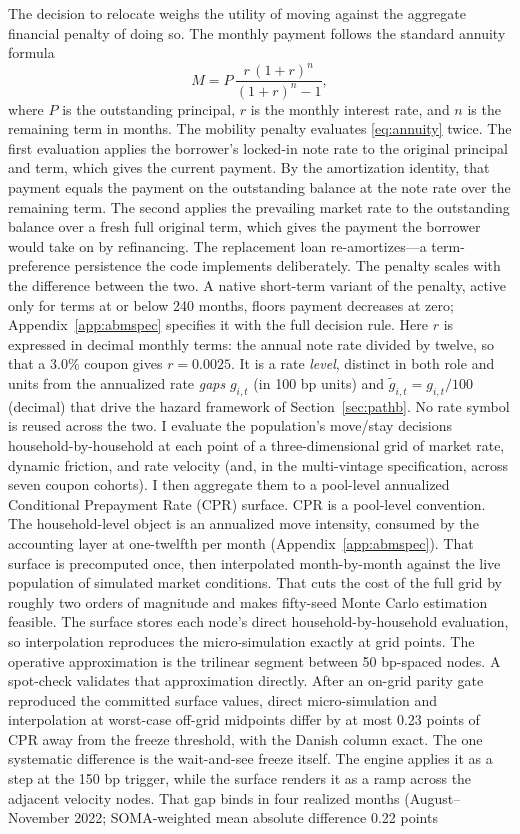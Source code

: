 \documentclass[12pt]{article}
\begin{document}
The decision to relocate weighs the utility of moving against the aggregate financial penalty of doing so. The monthly payment follows the standard annuity formula
\begin{equation}\label{eq:annuity}
M = P\,\frac{r\,(1+r)^{n}}{(1+r)^{n}-1},
\end{equation}
where $P$ is the outstanding principal, $r$ is the monthly interest rate, and $n$ is the remaining term in months. The mobility penalty evaluates \eqref{eq:annuity} twice. The first evaluation applies the borrower's locked-in note rate to the original principal and term, which gives the current payment. By the amortization identity, that payment equals the payment on the outstanding balance at the note rate over the remaining term. The second applies the prevailing market rate to the outstanding balance over a fresh full original term, which gives the payment the borrower would take on by refinancing. The replacement loan re-amortizes---a term-preference persistence the code implements deliberately. The penalty scales with the difference between the two. A native short-term variant of the penalty, active only for terms at or below 240 months, floors payment decreases at zero; Appendix~\ref{app:abmspec} specifies it with the full decision rule. Here $r$ is expressed in decimal monthly terms: the annual note rate divided by twelve, so that a 3.0\% coupon gives $r = 0.0025$. It is a rate \emph{level}, distinct in both role and units from the annualized rate \emph{gaps} $g_{i,t}$ (in 100 bp units) and $\tilde g_{i,t} = g_{i,t}/100$ (decimal) that drive the hazard framework of Section~\ref{sec:pathb}. No rate symbol is reused across the two. I evaluate the population's move/stay decisions household-by-household at each point of a three-dimensional grid of market rate, dynamic friction, and rate velocity (and, in the multi-vintage specification, across seven coupon cohorts). I then aggregate them to a pool-level annualized Conditional Prepayment Rate (CPR) surface. CPR is a pool-level convention. The household-level object is an annualized move intensity, consumed by the accounting layer at one-twelfth per month (Appendix~\ref{app:abmspec}). That surface is precomputed once, then interpolated month-by-month against the live population of simulated market conditions. That cuts the cost of the full grid by roughly two orders of magnitude and makes fifty-seed Monte Carlo estimation feasible. The surface stores each node's direct household-by-household evaluation, so interpolation reproduces the micro-simulation exactly at grid points. The operative approximation is the trilinear segment between 50 bp-spaced nodes. A spot-check validates that approximation directly. After an on-grid parity gate reproduced the committed surface values, direct micro-simulation and interpolation at worst-case off-grid midpoints differ by at most 0.23 points of CPR away from the freeze threshold, with the Danish column exact. The one systematic difference is the wait-and-see freeze itself. The engine applies it as a step at the 150 bp trigger, while the surface renders it as a ramp across the adjacent velocity nodes. That gap binds in four realized months (August--November 2022; SOMA-weighted mean absolute difference 0.22 points 
\end{document}
